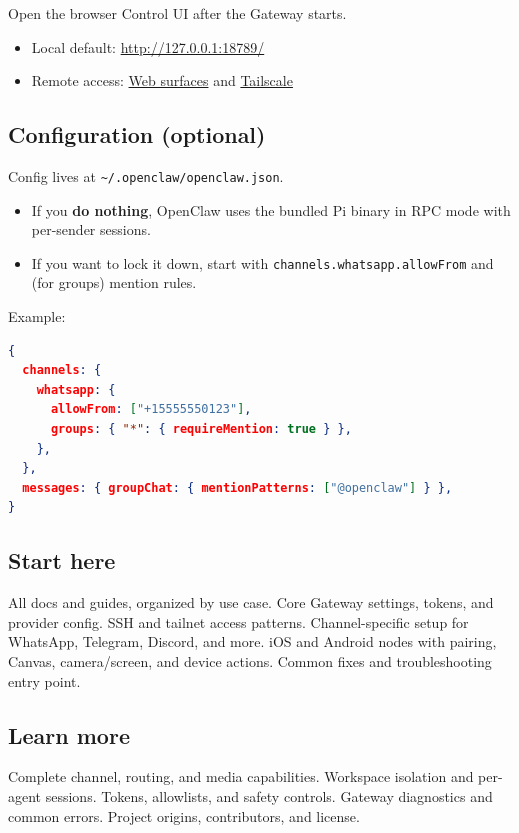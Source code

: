 Open the browser Control UI after the Gateway starts.

\begin{itemize}
  \item Local default: \href{http://127.0.0.1:18789/}{http://127.0.0.1:18789/}
  \item Remote access: \href{/web}{Web surfaces} and \href{/gateway/tailscale}{Tailscale}
\end{itemize}



\subsection{Configuration (optional)}


Config lives at \texttt{\textasciitilde{}/.openclaw/openclaw.json}.

\begin{itemize}
  \item If you \textbf{do nothing}, OpenClaw uses the bundled Pi binary in RPC mode with per-sender sessions.
  \item If you want to lock it down, start with \texttt{channels.whatsapp.allowFrom} and (for groups) mention rules.
\end{itemize}


Example:

\begin{lstlisting}[language=json]
{
  channels: {
    whatsapp: {
      allowFrom: ["+15555550123"],
      groups: { "*": { requireMention: true } },
    },
  },
  messages: { groupChat: { mentionPatterns: ["@openclaw"] } },
}
\end{lstlisting}


\subsection{Start here}


All docs and guides, organized by use case.
Core Gateway settings, tokens, and provider config.
SSH and tailnet access patterns.
Channel-specific setup for WhatsApp, Telegram, Discord, and more.
iOS and Android nodes with pairing, Canvas, camera/screen, and device actions.
Common fixes and troubleshooting entry point.

\subsection{Learn more}


Complete channel, routing, and media capabilities.
Workspace isolation and per-agent sessions.
Tokens, allowlists, and safety controls.
Gateway diagnostics and common errors.
Project origins, contributors, and license.



